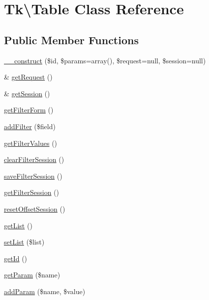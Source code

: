 \hypertarget{classTk_1_1Table}{\section{Tk\textbackslash{}Table Class Reference}
\label{classTk_1_1Table}
}
\subsection*{Public Member Functions}
\begin{DoxyCompactItemize}
\item 
\hyperlink{classTk_1_1Table_a72026382a6352e34a4512945b0e5d049}{\+\_\+\+\_\+construct} (\$id, \$params=array(), \$request=null, \$session=null)
\item 
\& \hyperlink{classTk_1_1Table_acb1c60d2f38b8232e63d43f121c420c9}{get\+Request} ()
\item 
\& \hyperlink{classTk_1_1Table_ab350d8c4d114736a8e547312130b7798}{get\+Session} ()
\item 
\hyperlink{classTk_1_1Table_ab3c67cdc5ede66394a48e0e008256c98}{get\+Filter\+Form} ()
\item 
\hyperlink{classTk_1_1Table_a09887b37d69cb9c622718db55ee7ff15}{add\+Filter} (\$field)
\item 
\hyperlink{classTk_1_1Table_a3243a7b94ffa2bcb050b84412cd37dba}{get\+Filter\+Values} ()
\item 
\hyperlink{classTk_1_1Table_a934cf388cf75c8a4855b437aee6a19b0}{clear\+Filter\+Session} ()
\item 
\hyperlink{classTk_1_1Table_ae12478118359b37b057b336a20a5b2c5}{save\+Filter\+Session} ()
\item 
\hyperlink{classTk_1_1Table_aaafacfcd7441890dc0921f13c0e43b0d}{get\+Filter\+Session} ()
\item 
\hyperlink{classTk_1_1Table_ab7ff78f592419476077cbc063556d723}{reset\+Offset\+Session} ()
\item 
\hyperlink{classTk_1_1Table_a3b114c9f3583b2e4dc1e6538f52e0fa0}{get\+List} ()
\item 
\hyperlink{classTk_1_1Table_aa5f78152ec567dda1c1cf2dc80e4764c}{set\+List} (\$list)
\item 
\hyperlink{classTk_1_1Table_ae081804ed7cc0464c452f7f3534695cb}{get\+Id} ()
\item 
\hyperlink{classTk_1_1Table_a806702fa74086da7698195ec02837bdf}{get\+Param} (\$name)
\item 
\hyperlink{classTk_1_1Table_ad03cdeb27ada789559e53cdb2ca3ecf6}{add\+Param} (\$name, \$value)

\end{DoxyCompactItemize}
